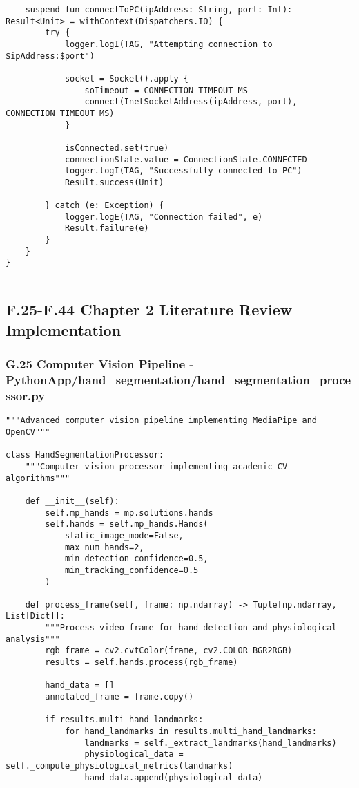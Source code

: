\documentclass[11pt,a4paper]{article}
\begin{document}
{{\begin{verbatim}
    suspend fun connectToPC(ipAddress: String, port: Int): Result<Unit> = withContext(Dispatchers.IO) {
        try {
            logger.logI(TAG, "Attempting connection to $ipAddress:$port")

            socket = Socket().apply {
                soTimeout = CONNECTION_TIMEOUT_MS
                connect(InetSocketAddress(ipAddress, port), CONNECTION_TIMEOUT_MS)
            }

            isConnected.set(true)
            connectionState.value = ConnectionState.CONNECTED
            logger.logI(TAG, "Successfully connected to PC")
            Result.success(Unit)

        } catch (e: Exception) {
            logger.logE(TAG, "Connection failed", e)
            Result.failure(e)
        }
    }
}
\end{verbatim}

\hrule

\subsection{F.25-F.44 Chapter 2 Literature Review Implementation}

\subsubsection{G.25 Computer Vision Pipeline - PythonApp/hand_segmentation/hand_segmentation_processor.py}

\begin{verbatim}
"""Advanced computer vision pipeline implementing MediaPipe and OpenCV"""

class HandSegmentationProcessor:
    """Computer vision processor implementing academic CV algorithms"""

    def __init__(self):
        self.mp_hands = mp.solutions.hands
        self.hands = self.mp_hands.Hands(
            static_image_mode=False,
            max_num_hands=2,
            min_detection_confidence=0.5,
            min_tracking_confidence=0.5
        )

    def process_frame(self, frame: np.ndarray) -> Tuple[np.ndarray, List[Dict]]:
        """Process video frame for hand detection and physiological analysis"""
        rgb_frame = cv2.cvtColor(frame, cv2.COLOR_BGR2RGB)
        results = self.hands.process(rgb_frame)

        hand_data = []
        annotated_frame = frame.copy()

        if results.multi_hand_landmarks:
            for hand_landmarks in results.multi_hand_landmarks:
                landmarks = self._extract_landmarks(hand_landmarks)
                physiological_data = self._compute_physiological_metrics(landmarks)
                hand_data.append(physiological_data)


\end{verbatim}}}
\end{document}
